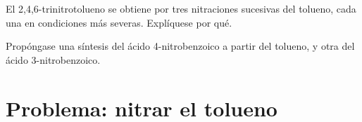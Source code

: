 \begin{exercise}[$\star\star\star$]\label{exo:b2:aromatic-substitution:11}
El 2,4,6-trinitrotolueno se obtiene por tres nitraciones sucesivas del tolueno, cada una en condiciones
más severas. Explíquese por qué.
\end{exercise}

\begin{exercise}[$\star\star\star$]\label{exo:b2:aromatic-substitution:12}
Propóngase una síntesis del ácido 4-nitrobenzoico a partir del tolueno, y otra del ácido 3-nitrobenzoico.
\end{exercise}

\section{Problema: nitrar el tolueno}

